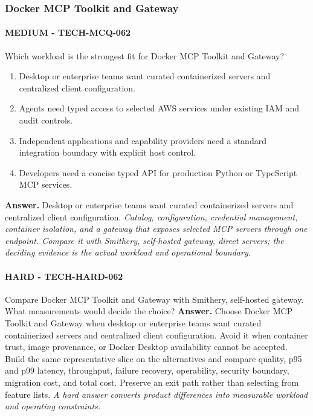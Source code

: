 \subsubsection*{Docker MCP Toolkit and Gateway}
\paragraph{MEDIUM - TECH-MCQ-062} Which workload is the strongest fit for Docker MCP Toolkit and Gateway?
\begin{enumerate}[label=\Alph*.]
\item Desktop or enterprise teams want curated containerized servers and centralized client configuration.
\item Agents need typed access to selected AWS services under existing IAM and audit controls.
\item Independent applications and capability providers need a standard integration boundary with explicit host control.
\item Developers need a concise typed API for production Python or TypeScript MCP services.
\end{enumerate}
\textbf{Answer.} Desktop or enterprise teams want curated containerized servers and centralized client configuration.
\textit{Catalog, configuration, credential management, container isolation, and a gateway that exposes selected MCP servers through one endpoint. Compare it with Smithery, self-hosted gateway, direct servers; the deciding evidence is the actual workload and operational boundary.}
\paragraph{HARD - TECH-HARD-062} Compare Docker MCP Toolkit and Gateway with Smithery, self-hosted gateway. What measurements would decide the choice?
\textbf{Answer.} Choose Docker MCP Toolkit and Gateway when desktop or enterprise teams want curated containerized servers and centralized client configuration. Avoid it when container trust, image provenance, or Docker Desktop availability cannot be accepted. Build the same representative slice on the alternatives and compare quality, p95 and p99 latency, throughput, failure recovery, operability, security boundary, migration cost, and total cost. Preserve an exit path rather than selecting from feature lists.
\textit{A hard answer converts product differences into measurable workload and operating constraints.}

